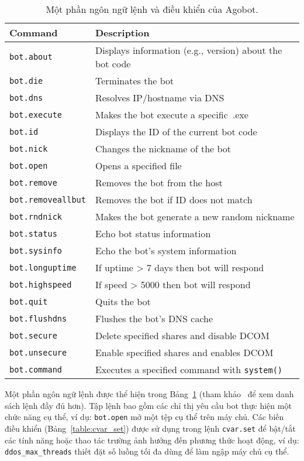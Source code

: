 \begin{table}[ht]
	\caption{Một phần ngôn ngữ lệnh và điều khiển của Agobot.}\label{table:botcmd}
	\centering
	\footnotesize
	\begin{tabular}{l l}
		\toprule
		\textbf{Command} &
		\textbf{Description} \\
		\midrule
		\texttt{bot.about} & Displays information (e.g., version) about the bot code \\
		\texttt{bot.die} & Terminates the bot \\
		\texttt{bot.dns} & Resolves IP/hostname via DNS \\
		\texttt{bot.execute} & Makes the bot execute a specific~.exe \\
		\texttt{bot.id} & Displays the ID of the current bot code \\
		\texttt{bot.nick} & Changes the nickname of the bot \\
		\texttt{bot.open} & Opens a specified file \\
		\texttt{bot.remove} & Removes the bot from the host \\
		\texttt{bot.removeallbut} & Removes the bot if ID does not match \\
		\texttt{bot.rndnick} & Makes the bot generate a new random nickname \\
		\texttt{bot.status} & Echo bot status information \\
		\texttt{bot.sysinfo} & Echo the bot's system information \\
		\texttt{bot.longuptime} & If uptime > 7 days then bot will respond \\
		\texttt{bot.highspeed} & If speed > 5000 then bot will respond \\
		\texttt{bot.quit} & Quits the bot \\
		\texttt{bot.flushdns} & Flushes the bot's DNS cache \\
		\texttt{bot.secure} & Delete specified shares and disable DCOM \\
		\texttt{bot.unsecure} & Enable specified shares and enables DCOM \\
		\texttt{bot.command} & Executes a specified command with \verb|system()| \\
		\bottomrule
	\end{tabular}
\end{table}

Một phần ngôn ngữ lệnh được thể hiện trong Bảng~\ref{table:botcmd}
(tham khảo~\cite{lurhq} để xem danh sách lệnh đầy đủ hơn).
Tập lệnh bao gồm các chỉ thị yêu cầu bot thực hiện một chức năng cụ thể,
ví dụ: \texttt{bot.open} mở một tệp cụ thể trên máy chủ.
Các biến điều khiển (Bảng~\ref{table:cvar_set}) được sử dụng trong lệnh \texttt{cvar.set}
để bật/tắt các tính năng hoặc thao tác trường ảnh hưởng đến phương thức hoạt động,
ví dụ:
\verb|ddos_max_threads| thiết đặt số luồng tối đa dùng để làm ngập máy chủ cụ thể.

